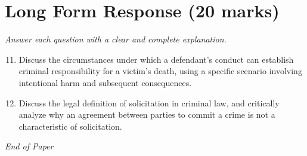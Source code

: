 \documentclass[12pt]{article}
\begin{document}
\section*{Long Form Response (20 marks)}
\textit{Answer each question with a clear and complete explanation.}
\begin{enumerate}[label=\arabic*.]
\setcounter{enumi}{10}
\item Discuss the circumstances under which a defendant's conduct can establish criminal responsibility for a victim's death, using a specific scenario involving intentional harm and subsequent consequences.
\item Discuss the legal definition of solicitation in criminal law, and critically analyze why an agreement between parties to commit a crime is not a characteristic of solicitation.
\end{enumerate}

\vfill
\noindent\textit{End of Paper}
\end{document}
